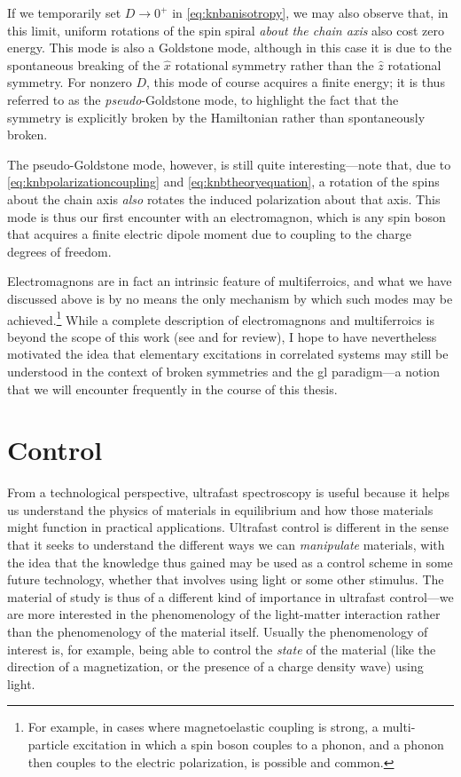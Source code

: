 If we temporarily set $D\rightarrow 0^+$ in \cref{eq:knbanisotropy}, we may also observe that, in this limit, uniform rotations of the spin spiral \emph{about the chain axis} also cost zero energy.
This mode is also a Goldstone mode, although in this case it is due to the spontaneous breaking of the $\hat{x}$ rotational symmetry rather than the $\hat{z}$ rotational symmetry.
For nonzero $D$, this mode of course acquires a finite energy; it is thus referred to as the \emph{pseudo}-Goldstone mode, to highlight the fact that the symmetry is explicitly broken by the Hamiltonian rather than spontaneously broken.

The pseudo-Goldstone mode, however, is still quite interesting---note that, due to \cref{eq:knbpolarizationcoupling} and \cref{eq:knbtheoryequation}, a rotation of the spins about the chain axis \emph{also} rotates the induced polarization about that axis.
This mode is thus our first encounter with an electromagnon, which is any spin boson that acquires a finite electric dipole moment due to coupling to the charge degrees of freedom.

Electromagnons are in fact an intrinsic feature of multiferroics, and what we have discussed above is by no means the only mechanism by which such modes may be achieved.\footnote{For example, in cases where magnetoelastic coupling is strong, a multi-particle excitation in which a spin boson couples to a phonon, and a phonon then couples to the electric polarization, is possible and common\citep{takahashi_magnetoelectric_2012}.}
While a complete description of electromagnons and multiferroics is beyond the scope of this work (see \citet{cheong_multiferroics_2007} and \citet{fiebig_evolution_2016} for review), I hope to have nevertheless motivated the idea that elementary excitations in correlated systems may still be understood in the context of broken symmetries and the \gls{gl} paradigm---a notion that we will encounter frequently in the course of this thesis.

\section{Control}\label{sec:ultrafastcontrol}

From a technological perspective, ultrafast spectroscopy is useful because it helps us understand the physics of materials in equilibrium and how those materials might function in practical applications.
Ultrafast control is different in the sense that it seeks to understand the different ways we can \emph{manipulate} materials, with the idea that the knowledge thus gained may be used as a control scheme in some future technology, whether that involves using light or some other stimulus.
The material of study is thus of a different kind of importance in ultrafast control---we are more interested in the phenomenology of the light-matter interaction rather than the phenomenology of the material itself.
Usually the phenomenology of interest is, for example, being able to control the \emph{state} of the material (like the direction of a magnetization, or the presence of a charge density wave) using light.

